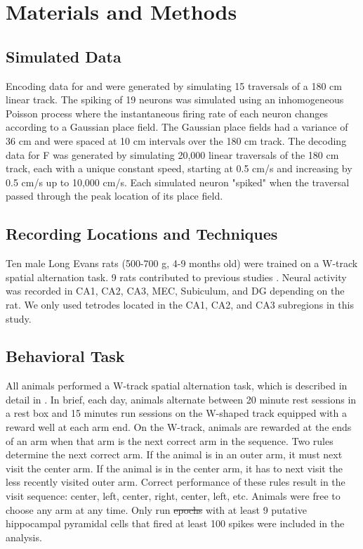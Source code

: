 \documentclass[9pt,lineno]{elife}
\providecommand{\DIFadd}[1]{{\protect\color{blue}\uwave{#1}}} %
\providecommand{\DIFdel}[1]{{\protect\color{red}\sout{#1}}}                      %
\providecommand{\DIFaddbegin}{} %
\providecommand{\DIFaddend}{} %
\providecommand{\DIFdelbegin}{} %
\providecommand{\DIFdelend}{} %
\newcommand{\DIFscaledelfig}{0.5}
\newlength{\DIFdelgraphicswidth} %
\newlength{\DIFdelgraphicsheight} %
\newcommand{\DIFaddincludegraphics}[2][]{{\color{blue}\fbox{\DIFOincludegraphics[#1]{#2}}}} %
\newcommand{\DIFdelincludegraphics}[2][]{%
\sbox{\DIFdelgraphicsbox}{\DIFOincludegraphics[#1]{#2}}%
\settoboxwidth{\DIFdelgraphicswidth}{\DIFdelgraphicsbox} %
\settoboxtotalheight{\DIFdelgraphicsheight}{\DIFdelgraphicsbox} %
\scalebox{\DIFscaledelfig}{%
\parbox[b]{\DIFdelgraphicswidth}{\usebox{\DIFdelgraphicsbox}\\[-\baselineskip] \rule{\DIFdelgraphicswidth}{0em}}\llap{\resizebox{\DIFdelgraphicswidth}{\DIFdelgraphicsheight}{%
\setlength{\unitlength}{\DIFdelgraphicswidth}%
\begin{picture}(1,1)%
\thicklines\linethickness{2pt} %
{\color[rgb]{1,0,0}\put(0,0){\framebox(1,1){}}}%
{\color[rgb]{1,0,0}\put(0,0){\line( 1,1){1}}}%
{\color[rgb]{1,0,0}\put(0,1){\line(1,-1){1}}}%
\end{picture}%
}\hspace*{3pt}}} %
} %
\DeclareRobustCommand{\DIFaddbegin}{\DIFOaddbegin \let\includegraphics\DIFaddincludegraphics} %
\DeclareRobustCommand{\DIFaddend}{\DIFOaddend \let\includegraphics\DIFOincludegraphics} %
\DeclareRobustCommand{\DIFdelbegin}{\DIFOdelbegin \let\includegraphics\DIFdelincludegraphics} %
\DeclareRobustCommand{\DIFdelend}{\DIFOaddend \let\includegraphics\DIFOincludegraphics} %
\begin{document}
\section*{Materials and Methods}

\subsection*{Simulated Data}
Encoding data for  and  were generated by simulating 15 traversals of a 180 cm linear track. The spiking of 19 neurons was simulated using an inhomogeneous Poisson process where the instantaneous firing rate of each neuron changes according to a Gaussian place field. The Gaussian place fields had a variance of 36 cm and were spaced at 10 cm intervals over the 180 cm track. The decoding data for F was generated by simulating 20,000 linear traversals of the 180 cm track, each with a unique constant speed, starting at 0.5 cm/s and increasing by 0.5 cm/s up to 10,000 cm/s. Each simulated neuron "spiked" when the traversal passed through the peak location of its place field.

\subsection*{Recording Locations and Techniques}
Ten male Long Evans rats (500-700 g, 4-9 months old) were trained on a W-track spatial alternation task. 9 rats contributed to previous studies \citep{KarlssonAwakereplayremote2009, KayConstantSubsecondCycling2020, Kayhippocampalnetworkspatial2016, CarrTransientSlowGamma2012}. Neural activity was recorded in CA1, CA2, CA3, MEC, Subiculum, and DG depending on the rat. We only used tetrodes located in the CA1, CA2, and CA3 subregions in this study.

\subsection*{Behavioral Task}
All animals performed a W-track spatial alternation task, which is described in detail in \cite{KarlssonAwakereplayremote2009}. In brief, each day, animals alternate between 20 minute rest sessions in a rest box and 15 minutes run sessions on the W-shaped track equipped with a reward well at each arm end. On the W-track, animals are rewarded at the ends of an arm when that arm is the next correct arm in the sequence. Two rules determine the next correct arm. If the animal is in an outer arm, it must next visit the center arm. If the animal is in the center arm, it has to next visit the less recently visited outer arm. Correct performance of these rules result in the visit sequence: center, left, center, right, center, left, etc. Animals were free to choose any arm at any time. Only run \DIFdelbegin \DIFdel{epochs }\DIFdelend \DIFaddbegin \DIFadd{recording sessions }\DIFaddend with at least 9 putative hippocampal pyramidal cells that fired at least 100 spikes were included in the analysis.
\end{document}

